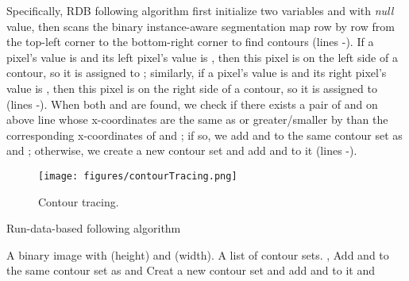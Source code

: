 \documentclass{article}
\begin{document}
Specifically, RDB following algorithm first initialize two variables  and  with \emph{null} value, then scans the binary instance-aware segmentation map row by row from the top-left corner to the bottom-right corner to find contours (lines -). If a pixel's value is  and its left pixel's value is , then this pixel is on the left side of a contour, so it is assigned to ; similarly, if a pixel's value is  and its right pixel's value is , then this pixel is on the right side of a contour, so it is assigned to  (lines -). When both  and  are found, we check if there exists a pair of  and  on above line whose x-coordinates are the same as or greater/smaller by  than the corresponding x-coordinates of  and ; if so, we add  and  to the same contour set as  and ; otherwise, we create a new contour set and add  and  to it (lines -).





\begin{figure*}[!t]
  \centering
     \texttt{[image: figures/contourTracing.png]}\label{fig:contour_tracing}
  \caption{Contour tracing.}
  \end{figure*}




\begin{algorithm}[!t]
  \caption{Run-data-based following algorithm\label{rdb}}
  \begin{algorithmic}[1]
     \Require
     A binary image with  (height) and  (width).
     \Ensure
     A list of contour sets.
		\State , 
					\State 
				\EndIf
					\State 
				\EndIf
						\State Add  and  to the same contour set as  and 
					\Else
						\State Creat a new contour set and add  and   to it
					\EndIf
					\State  and 
				\EndIf
			\EndFor
		 \EndFor
  \end{algorithmic}
\end{algorithm}
\end{document}
